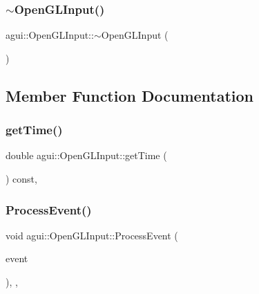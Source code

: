 \subsubsection{\texorpdfstring{$\sim$\+Open\+G\+L\+Input()}{~OpenGLInput()}}
{\footnotesize\ttfamily agui\+::\+Open\+G\+L\+Input\+::$\sim$\+Open\+G\+L\+Input (\begin{DoxyParamCaption}{ }\end{DoxyParamCaption})\hspace{0.3cm}{\ttfamily [virtual]}}



\subsection{Member Function Documentation}
\mbox{\label{classagui_1_1_open_g_l_input_afff68e181f8d772a642ecb8de48833db}} 
\subsubsection{\texorpdfstring{get\+Time()}{getTime()}}
{\footnotesize\ttfamily double agui\+::\+Open\+G\+L\+Input\+::get\+Time (\begin{DoxyParamCaption}{ }\end{DoxyParamCaption}) const\hspace{0.3cm}{\ttfamily [override]}, {\ttfamily [virtual]}}

\mbox{\label{classagui_1_1_open_g_l_input_afee8d588768cea3b75bcb3de36e03397}} 
\subsubsection{\texorpdfstring{Process\+Event()}{ProcessEvent()}}
{\footnotesize\ttfamily void agui\+::\+Open\+G\+L\+Input\+::\+Process\+Event (\begin{DoxyParamCaption}\item[{const \mbox{\hyperlink{structec_1_1_input_event}{ec\+::\+Input\+Event}} \&}]{event }\end{DoxyParamCaption})\hspace{0.3cm}{\ttfamily [override]}, {\ttfamily [protected]}, {\ttfamily [virtual]}}



